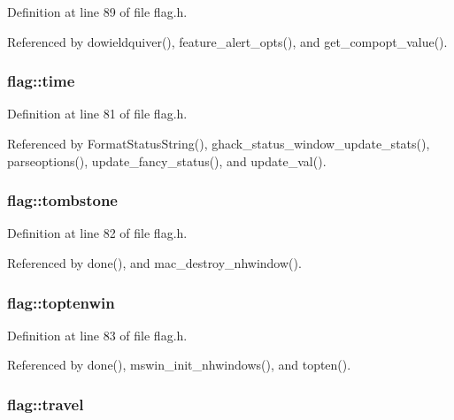 Definition at line 89 of file flag.\+h.



Referenced by dowieldquiver(), feature\+\_\+alert\+\_\+opts(), and get\+\_\+compopt\+\_\+value().

\hypertarget{structflag_adacd6190247689360201f34b2aa9148a}{
\subsubsection[{time}]{ flag\+::time}}\label{structflag_adacd6190247689360201f34b2aa9148a}


Definition at line 81 of file flag.\+h.



Referenced by Format\+Status\+String(), ghack\+\_\+status\+\_\+window\+\_\+update\+\_\+stats(), parseoptions(), update\+\_\+fancy\+\_\+status(), and update\+\_\+val().

\hypertarget{structflag_adf925ab4c64cb50977b633e1713050d6}{
\subsubsection[{tombstone}]{ flag\+::tombstone}}\label{structflag_adf925ab4c64cb50977b633e1713050d6}


Definition at line 82 of file flag.\+h.



Referenced by done(), and mac\+\_\+destroy\+\_\+nhwindow().

\hypertarget{structflag_a82cef9011b510b91ae45af332672fcc6}{
\subsubsection[{toptenwin}]{ flag\+::toptenwin}}\label{structflag_a82cef9011b510b91ae45af332672fcc6}


Definition at line 83 of file flag.\+h.



Referenced by done(), mswin\+\_\+init\+\_\+nhwindows(), and topten().

\hypertarget{structflag_abe72b39197f5cbc611db8c44e477ccbc}{
\subsubsection[{travel}]{ flag\+::travel}}\label{structflag_abe72b39197f5cbc611db8c44e477ccbc}


